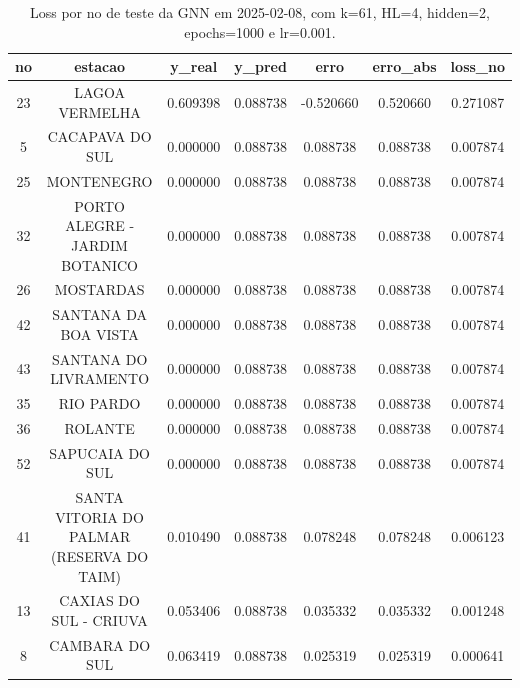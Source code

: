 \begin{table}[h]
\centering
\caption{Loss por no de teste da GNN em 2025-02-08, com k=61, HL=4, hidden=2, epochs=1000 e lr=0.001.}
\label{tab:gnn_loss_k61_hl4_h2_e1000_d20250208}
\begin{tabular}{ccccccc}
\toprule
no & estacao & y\_real & y\_pred & erro & erro\_abs & loss\_no \\
\midrule
23 & LAGOA VERMELHA & 0.609398 & 0.088738 & -0.520660 & 0.520660 & 0.271087 \\
5 & CACAPAVA DO SUL & 0.000000 & 0.088738 & 0.088738 & 0.088738 & 0.007874 \\
25 & MONTENEGRO & 0.000000 & 0.088738 & 0.088738 & 0.088738 & 0.007874 \\
32 & PORTO ALEGRE - JARDIM BOTANICO & 0.000000 & 0.088738 & 0.088738 & 0.088738 & 0.007874 \\
26 & MOSTARDAS & 0.000000 & 0.088738 & 0.088738 & 0.088738 & 0.007874 \\
42 & SANTANA DA BOA VISTA & 0.000000 & 0.088738 & 0.088738 & 0.088738 & 0.007874 \\
43 & SANTANA DO LIVRAMENTO & 0.000000 & 0.088738 & 0.088738 & 0.088738 & 0.007874 \\
35 & RIO PARDO & 0.000000 & 0.088738 & 0.088738 & 0.088738 & 0.007874 \\
36 & ROLANTE & 0.000000 & 0.088738 & 0.088738 & 0.088738 & 0.007874 \\
52 & SAPUCAIA DO SUL & 0.000000 & 0.088738 & 0.088738 & 0.088738 & 0.007874 \\
41 & SANTA VITORIA DO PALMAR (RESERVA DO TAIM) & 0.010490 & 0.088738 & 0.078248 & 0.078248 & 0.006123 \\
13 & CAXIAS DO SUL - CRIUVA & 0.053406 & 0.088738 & 0.035332 & 0.035332 & 0.001248 \\
8 & CAMBARA DO SUL & 0.063419 & 0.088738 & 0.025319 & 0.025319 & 0.000641 \\
\bottomrule
\end{tabular}
\end{table}
